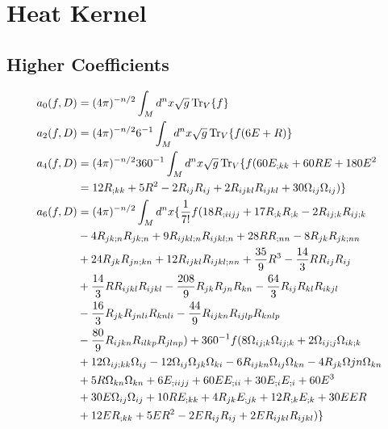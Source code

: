 \chapter{Heat Kernel}
\label{appendixa}

\section{Higher Coefficients}
\begin{align}
    a_{0} (f,D) &= (4\pi)^{-n/2} \int _{M} d^{n}x \sqrt{g}\Tr _{V} \lbrace f \rbrace \\
    a_{2} (f,D) &= (4\pi)^{-n/2} 6^{-1} \int _{M} d^{n}x \sqrt{g} \Tr _{V} \lbrace f(6E + R) \rbrace \\
    a_{4} (f,D) &= (4\pi)^{-n/2} 360^{-1} \int _{M}  d^{n}x \sqrt{g} \Tr _{V} \lbrace f(60 E_{;kk} + 60 RE + 180E^{2} \nonumber \\
    & = 12R_{;kk} + 5R^{2} -2R_{ij}R_{ij} + 2R_{ijkl}R_{ijkl} + 30 \Omega_{ij} \Omega _{ij}) \rbrace \\
    a_{6} (f,D) & = (4\pi)^{-n/2} \int _{M} d^{n}x \lbrace \frac{1}{7!} f(18R_{;iijj} + 17R_{;k}R_{;k} - 2R_{ij;k}R_{ij;k} \nonumber \\
    & - 4R_{jk;n}R_{jk;n} + 9R_{ijkl;n} R_{ijkl;n} + 28RR_{;nn} - 8R_{jk} R_{jk;nn} \nonumber \\
    & +24R_{jk}R_{jn;kn} + 12R_{ijkl}R_{ijkl;nn} + \frac{35}{9}R^{3} - \frac{14}{3} RR_{ij}R_{ij} \nonumber \\
    & +\frac{14}{3} RR_{ijkl}R_{ijkl} - \frac{208}{9} R_{jk}R_{jn}R_{kn} -\frac{64}{3} R_{ij}R_{kl}R_{ikjl} \nonumber \\
    & - \frac{16}{3} R_{jk}R_{jnli} R_{knli} - \frac{44}{9} R_{ijkn}R_{ijlp} R_{knlp} \nonumber \\
    & - \frac{80}{9} R_{ijkn} R_{ilkp}R_{jlnp}) + 360^{-1} f (8\Omega_{ij;k}\Omega_{ij;k} + 2\Omega _{ij;j}\Omega_{ik;k} \nonumber \\
    & + 12\Omega_{ij;kk}\Omega_{ij} - 12\Omega_{ij}\Omega_{jk}\Omega_{ki} - 6R_{ijkn}\Omega_{ij}\Omega_{kn} -4R_{jk}\Omega{jn}\Omega_{kn} \nonumber \\
    & + 5R\Omega_{kn}\Omega_{kn} +6E_{;iijj} +60EE_{;ii} +30E_{;i}E_{;i} +60E^{3} \nonumber \\
    &+ 30E\Omega _{ij}\Omega_{ij} + 10 RE_{;kk} + 4R_{jk}E_{;jk} + 12R_{;k}E_{;k} + 30EER \nonumber \\
    & +12ER_{;kk} + 5ER^{2} -2ER_{ij}R_{ij} + 2ER_{ijkl}R_{ijkl}) \rbrace
\end{align}
